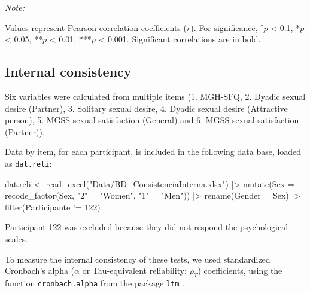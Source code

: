 \documentclass[
  bookmarksnumbered]{article}
\newenvironment{Shaded}{\begin{snugshade}}{\end{snugshade}}
\newcommand{\AttributeTok}[1]{\textcolor[rgb]{0.80,0.80,0.80}{#1}}
\newcommand{\DecValTok}[1]{\textcolor[rgb]{0.86,0.86,0.80}{#1}}
\newcommand{\FunctionTok}[1]{\textcolor[rgb]{0.94,0.94,0.56}{#1}}
\newcommand{\NormalTok}[1]{\textcolor[rgb]{0.80,0.80,0.80}{#1}}
\newcommand{\OtherTok}[1]{\textcolor[rgb]{0.94,0.94,0.56}{#1}}
\newcommand{\SpecialCharTok}[1]{\textcolor[rgb]{0.86,0.64,0.64}{#1}}
\newcommand{\StringTok}[1]{\textcolor[rgb]{0.80,0.58,0.58}{#1}}
\begin{document}
\begin{landscape}
\begin{table}[H]
{\begin{threeparttable}
\begin{tabular}[t]
\bottomrule
\end{tabular}
\begin{tablenotes}[para]
\item \textit{Note: } 
\item Values represent Pearson correlation coefficients ($r$). For significance, $^{\dagger}p$ < 0.1, *$p$ < 0.05, **$p$ < 0.01, ***$p$ < 0.001. Significant correlations are in bold.
\end{tablenotes}
\end{threeparttable}}
\end{table}
\end{landscape}

\subsection{Internal consistency}\label{internal-consistency}

Six variables were calculated from multiple items (1. MGH-SFQ, 2. Dyadic sexual desire (Partner), 3. Solitary sexual desire, 4. Dyadic sexual desire (Attractive person), 5. MGSS sexual satisfaction (General) and 6. MGSS sexual satisfaction (Partner)).

Data by item, for each participant, is included in the following data base, loaded as \texttt{dat.reli}:

\begin{Shaded}
\begin{Highlighting}[]
\NormalTok{dat.reli }\OtherTok{\textless{}{-}} \FunctionTok{read\_excel}\NormalTok{(}\StringTok{"Data/BD\_ConsistenciaInterna.xlsx"}\NormalTok{)  }\SpecialCharTok{|\textgreater{}}  
  \FunctionTok{mutate}\NormalTok{(}\AttributeTok{Sex =} \FunctionTok{recode\_factor}\NormalTok{(Sex,}
                             \StringTok{"2"} \OtherTok{=} \StringTok{"Women"}\NormalTok{,}
                             \StringTok{"1"} \OtherTok{=} \StringTok{"Men"}\NormalTok{)) }\SpecialCharTok{|\textgreater{}} 
  \FunctionTok{rename}\NormalTok{(}\AttributeTok{Gender =}\NormalTok{ Sex) }\SpecialCharTok{|\textgreater{}} 
  \FunctionTok{filter}\NormalTok{(Participante }\SpecialCharTok{!=} \DecValTok{122}\NormalTok{)}
\end{Highlighting}
\end{Shaded}

Participant 122 was excluded because they did not respond the psychological scales.

To measure the internal consistency of these tests, we used standardized Cronbach's alpha (\(\alpha\) or Tau-equivalent reliability: \(\rho_{T}\)) coefficients, using the function \texttt{cronbach.alpha} from the package \texttt{ltm} \autocite{LtmPackageLatent2006}.
\end{document}
